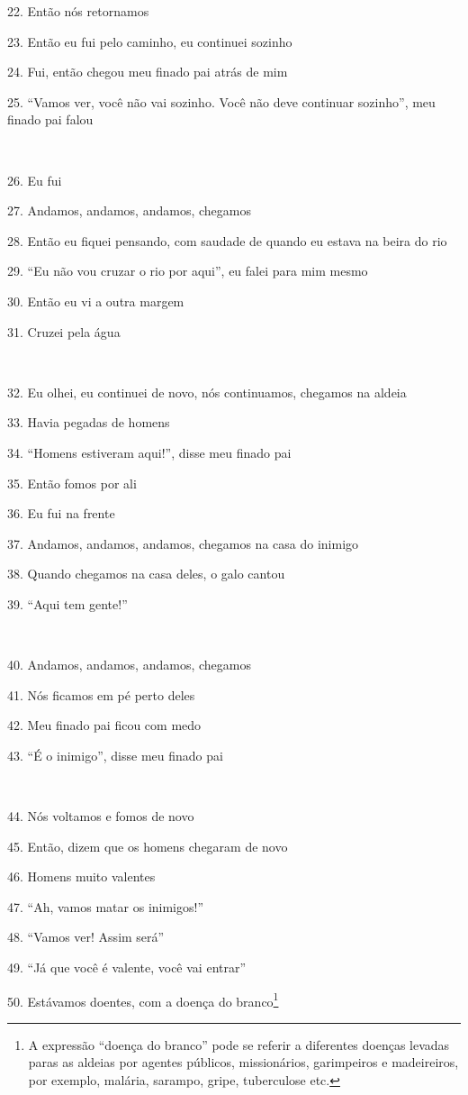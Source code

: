 22. Então nós retornamos

23. Então eu fui pelo caminho, eu continuei sozinho

24. Fui, então chegou meu finado pai atrás de mim

25. ``Vamos ver, você não vai sozinho. Você não deve continuar sozinho'',
meu finado pai falou

~

26. Eu fui

27. Andamos, andamos, andamos, chegamos

28. Então eu fiquei pensando, com saudade de quando eu estava na beira do
rio

29. ``Eu não vou cruzar o rio por aqui'', eu falei para mim mesmo

30. Então eu vi a outra margem

31. Cruzei pela água

~

32. Eu olhei, eu continuei de novo, nós continuamos, chegamos na aldeia

33. Havia pegadas de homens

34. ``Homens estiveram aqui!'', disse meu finado pai

35. Então fomos por ali

36. Eu fui na frente

37. Andamos, andamos, andamos, chegamos na casa do inimigo

38. Quando chegamos na casa deles, o galo cantou

39. ``Aqui tem gente!''

~

40. Andamos, andamos, andamos, chegamos

41. Nós ficamos em pé perto deles

42. Meu finado pai ficou com medo

43. ``É o inimigo'', disse meu finado pai

~

44. Nós voltamos e fomos de novo

45. Então, dizem que os homens chegaram de novo

46. Homens muito valentes

47. ``Ah, vamos matar os inimigos!''

48. ``Vamos ver! Assim será''

49. ``Já que você é valente, você vai entrar''

50. Estávamos doentes, com a doença do branco\footnote{A expressão
  ``doença do branco'' pode se referir a diferentes doenças levadas
  paras as aldeias por agentes públicos, missionários, garimpeiros e
  madeireiros, por exemplo, malária, sarampo, gripe, tuberculose etc.}

